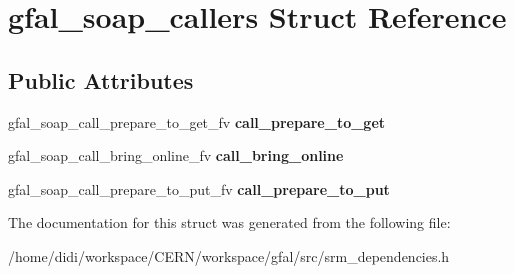 \section{gfal\_\-soap\_\-callers Struct Reference}
\label{structgfal__soap__callers}
\subsection*{Public Attributes}
\begin{DoxyCompactItemize}
\item 
gfal\_\-soap\_\-call\_\-prepare\_\-to\_\-get\_\-fv {\bfseries call\_\-prepare\_\-to\_\-get}\label{structgfal__soap__callers_a75ff79fc100bc430556e232bdea20755}

\item 
gfal\_\-soap\_\-call\_\-bring\_\-online\_\-fv {\bfseries call\_\-bring\_\-online}\label{structgfal__soap__callers_a85a98bdfe62ca3c32f78199fe7997482}

\item 
gfal\_\-soap\_\-call\_\-prepare\_\-to\_\-put\_\-fv {\bfseries call\_\-prepare\_\-to\_\-put}\label{structgfal__soap__callers_afee4d9df50f5a20c97841655fc27a5fa}

\end{DoxyCompactItemize}


The documentation for this struct was generated from the following file:\begin{DoxyCompactItemize}
\item 
/home/didi/workspace/CERN/workspace/gfal/src/srm\_\-dependencies.h\end{DoxyCompactItemize}
